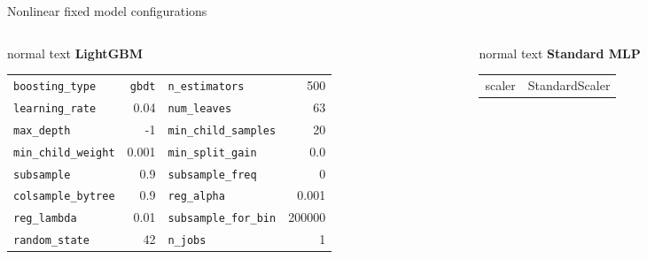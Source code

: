 \documentclass[aspectratio=169,10pt]{beamer}
\begin{document}
\begin{frame}[t]{Nonlinear fixed model configurations}
  \hypertarget{supp:surrogates-nonlinear-configs}{}
  \vspace{-0.18cm}\hfill
  \hspace{0.10cm}\GVBackupIndexButton
  \vspace{0.06cm}
  \begin{columns}[T,totalwidth=0.94\textwidth]
    \begin{column}{0.52\textwidth}
      \begin{beamercolorbox}[wd=\linewidth,sep=0.45em]{normal text}
        \small\textbf{\color{GVTeal}LightGBM}\par
        \vspace{0.07cm}\scriptsize
        \begin{tabular}{@{}lrlr@{}}
          \texttt{boosting\_type} & \texttt{gbdt} & \texttt{n\_estimators} & 500\\
          \texttt{learning\_rate} & 0.04 & \texttt{num\_leaves} & 63\\
          \texttt{max\_depth} & -1 & \texttt{min\_child\_samples} & 20\\
          \texttt{min\_child\_weight} & 0.001 & \texttt{min\_split\_gain} & 0.0\\
          \texttt{subsample} & 0.9 & \texttt{subsample\_freq} & 0\\
          \texttt{colsample\_bytree} & 0.9 & \texttt{reg\_alpha} & 0.001\\
          \texttt{reg\_lambda} & 0.01 & \texttt{subsample\_for\_bin} & 200000\\
          \texttt{random\_state} & 42 & \texttt{n\_jobs} & 1
        \end{tabular}
      \end{beamercolorbox}
    \end{column}
    \begin{column}{0.36\textwidth}
      \begin{beamercolorbox}[wd=\linewidth,sep=0.45em]{normal text}
        \small\textbf{\color{GVCouplingOrange}Standard MLP}\par
        \vspace{0.07cm}\scriptsize
        \begin{tabular}{@{}lr@{}}
          scaler & StandardScaler\\

\end{tabular}
\end{beamercolorbox}
\end{column}
\end{columns}
\end{frame}
\end{document}
